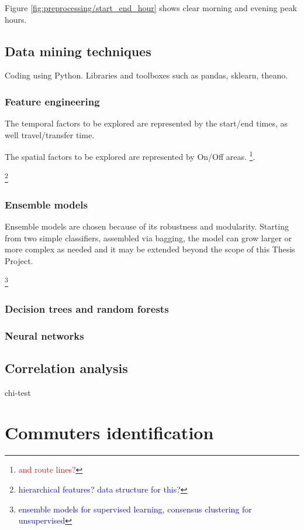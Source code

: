 \documentclass{article}
\newcommand{\selfnote}[1]{\footnote{\textcolor{red}{#1}}}
\newcommand{\technicalDoubt}[1]{\footnote{\textcolor{blue}{#1}}}
\begin{document}
Figure \ref{fig:preprocessing/start_end_hour} shows clear morning and evening peak hours. 

\subsection{Data mining techniques}
Coding using Python. Libraries and toolboxes such as pandas, sklearn, theano.

\subsubsection{Feature engineering}
The temporal factors to be explored are represented by the start/end times, as well travel/transfer time.

The spatial factors to be explored are represented by On/Off areas. \selfnote{and route lines?}. 

\technicalDoubt{hierarchical features? data structure for this?}

\subsubsection{Ensemble models}
Ensemble models are chosen because of its robustness and modularity. Starting from two simple classifiers, assembled via bagging, the model can grow larger or more complex as needed and it may be extended beyond the scope of this Thesis Project. 

\technicalDoubt{ensemble models for supervised learning, consensus clustering for unsupervised}

\subsubsection{Decision trees and random forests}

\subsubsection{Neural networks}



\subsection{Correlation analysis}
chi-test


\newpage
\section{Commuters identification}
\end{document}
